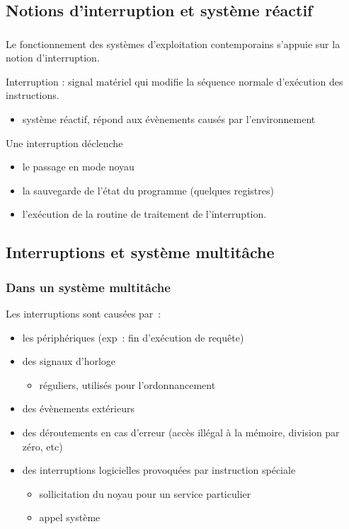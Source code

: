 \subsection{Notions d'interruption et système réactif}
\begin{frame}
\frametitle{\insertsubsection}
Le fonctionnement des systèmes d'exploitation contemporains s'appuie sur la notion
d'\alert{interruption}.\\
\vspace{0.5cm}

\alert{Interruption} : signal matériel qui modifie la séquence normale d'exécution
des instructions. \\
\vspace{0.2cm}
 
\begin{itemize}
\item[\ding{212}] \alert{système réactif}, répond aux évènements causés par l'environnement
\end{itemize}


Une interruption déclenche
\begin{itemize}
\item le passage en mode noyau
\item la \alert{sauvegarde de l'état} du programme (quelques registres)
\item l'exécution de la \alert{routine de traitement} de l'interruption.
\end{itemize}
\end{frame}

\subsection{Interruptions et système multitâche}
\begin{frame}
\frametitle{Dans un système multitâche}
  Les interruptions sont causées par~:
  \begin{itemize}
  \item les \alert{périphériques} (exp~: fin d'exécution de requête)
  \item des \alert{signaux d'horloge}
    \begin{itemize}
    \item réguliers, utilisés pour l'ordonnancement
    \end{itemize}
  \item des \alert{évènements extérieurs}
  \item des déroutements en cas d'\alert{erreur} (accès illégal à la mémoire, division par zéro, etc)
  \item des \alert{interruptions logicielles} provoquées par instruction spéciale
    \begin{itemize}
    \item sollicitation du noyau pour un service particulier
    \item[\ding{212}] \alert{appel système}
    \end{itemize}
  \end{itemize}
\end{frame}

